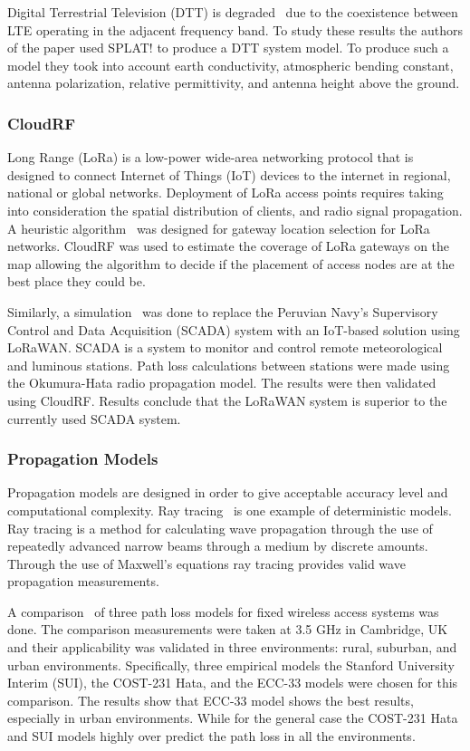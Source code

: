 Digital Terrestrial Television (DTT) is degraded~\cite{dttperformance} due to the coexistence between LTE operating in the adjacent
frequency band. To study these results the authors of the paper used SPLAT! to produce a DTT system model. To produce such a model
they took into account earth conductivity, atmospheric bending constant, antenna polarization, relative permittivity, and antenna height above
the ground.
%
\subsubsection*{CloudRF}
Long Range (LoRa) is a low-power wide-area networking protocol that is designed to connect Internet of Things (IoT) devices to the 
internet in regional, national or global networks. Deployment of LoRa access points requires taking into consideration the spatial 
distribution of clients, and radio signal propagation. A heuristic algorithm~\cite{heuristicalgorithm} was designed for gateway location
selection for LoRa networks. CloudRF was used to estimate the coverage of LoRa gateways on the map allowing the algorithm to
decide if the placement of access nodes are at the best place they could be. 

Similarly, a simulation~\cite{asimulation} was done to replace the Peruvian Navy's Supervisory Control and Data Acquisition (SCADA) 
system with an IoT-based solution using LoRaWAN. SCADA is a system to monitor and control remote meteorological and luminous 
stations. Path loss calculations between stations were made using the Okumura-Hata radio propagation model. The results were then 
validated using CloudRF. Results conclude that the LoRaWAN system is superior to the currently used SCADA system. 
%
\subsubsection*{Propagation Models}
Propagation models are designed in order to give acceptable accuracy level and computational complexity. Ray tracing~\cite{modelingand} 
is one example of deterministic models. Ray tracing is a method for calculating wave propagation through the use of repeatedly advanced
narrow beams through a medium by discrete amounts. Through the use of Maxwell's equations ray tracing provides valid wave propagation
measurements.

A comparison~\cite{comparisonofempirical} of three path loss models for fixed wireless access systems was done. The comparison
measurements were taken at 3.5 GHz in Cambridge, UK and their applicability was validated in three environments: rural, suburban,
and urban environments. Specifically, three empirical models the Stanford University Interim (SUI), the COST-231 Hata, and the ECC-33 
models were chosen for this comparison. The results show that ECC-33 model shows the best results, especially in urban environments.
While for the general case the COST-231 Hata and SUI models highly over predict the path loss in all the environments. 


